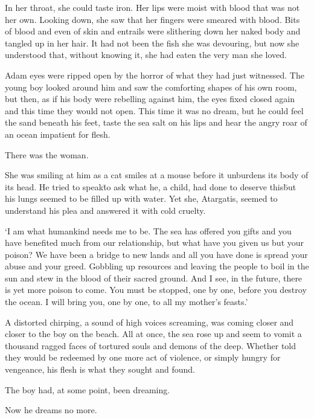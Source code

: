 In her throat, she could taste iron. Her lips were moist with blood
that was not her own. Looking down, she saw that her fingers were
smeared with blood. Bits of blood and even of skin and entrails were
slithering down her naked body and tangled up in her hair. It had not
been the fish she was devouring, but now she understood that, without
knowing it, she had eaten the very man she loved.

Adam eyes were ripped open by the horror of what they had just
witnessed. The young boy looked around him and saw the comforting
shapes of his own room, but then, as if his body were rebelling
against him, the eyes fixed closed again and this time they would not
open. This time it was no dream, but he could feel the sand beneath
his feet, taste the sea salt on his lips and hear the angry roar of an
ocean impatient for flesh.

There was the woman.

She was smiling at him as a cat smiles at a mouse before it unburdens
its body of its head.  He tried to speak\=to ask what he, a child, had
done to deserve this\=but his lungs seemed to be filled up with
water. Yet she, Atargatis, seemed to understand his plea and answered
it with cold cruelty.

`I am what humankind needs me to be. The sea has offered you gifts and
you have benefited much from our relationship, but what have you given
us but your poison? We have been a bridge to new lands and all you
have done is spread your abuse and your greed. Gobbling up resources
and leaving the people to boil in the sun and stew in the blood of
their sacred ground. And I see, in the future, there is yet more
poison to come. You must be stopped, one by one, before you destroy
the ocean. I will bring you, one by one, to all my mother’s feasts.'

A distorted chirping, a sound of high voices screaming, was coming
closer and closer to the boy on the beach. All at once, the sea rose
up and seem to vomit a thousand ragged faces of tortured souls and
demons of the deep. Whether told they would be redeemed by one more
act of violence, or simply hungry for vengeance, his flesh is what
they sought and found.

The boy had, at some point, been dreaming.

Now he dreams no more.
